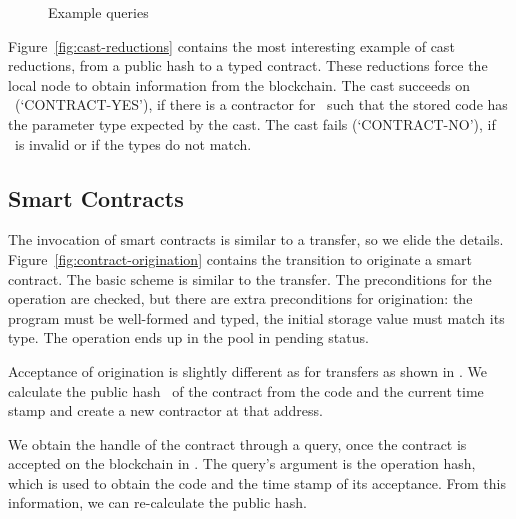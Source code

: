 \documentclass[runningheads]{llncs}
\begin{document}
\begin{figure}[t]
  \begin{mathpar}

  \end{mathpar}
  \caption{Example queries}
  \label{fig:example-queries}
\end{figure}


Figure~\ref{fig:cast-reductions} contains the most interesting
example of cast reductions, from a public hash to a typed
contract. These reductions force the local node to obtain information
from the blockchain. The cast succeeds on \PUH\ (`CONTRACT-YES'), if there is a
contractor for \PUH\ such that the stored code has the parameter type
expected by the cast. The cast fails (`CONTRACT-NO'), if \PUH\
is invalid or if the types do not match.




\subsection{Smart Contracts}
\label{sec:smart-contracts}

The invocation of smart contracts is similar to a transfer, so we
elide the details. Figure~\ref{fig:contract-origination} contains the
transition \TirName{Block-Originate} to originate a smart contract. The basic scheme is similar
to the transfer. The preconditions for the operation are checked, but
there are extra preconditions for origination:  the program must be
well-formed and typed, the initial storage value must match its
type. The operation ends up in the pool in pending status.

Acceptance of origination is slightly different as for transfers as
shown in \TirName{Block-Accept}. We calculate the public hash \PUH\ of the
contract from the code and the current time stamp and create a new
contractor at that address.  

We obtain the handle of the contract through a query, once the
contract is accepted on the blockchain in
. The query's argument is the operation
hash, which is used to obtain the code and the time stamp of its
acceptance. From this information, we can re-calculate the public
hash. 
\end{document}
